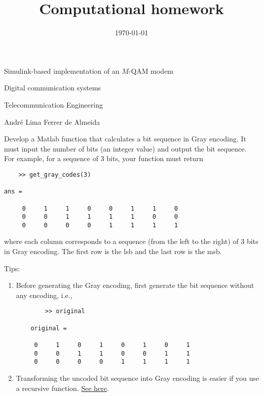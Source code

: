 \documentclass[12pt,a4paper]{article}
\begin{document}
\title{Computational homework}
\date{\today}
\maketitle

\begin{center}
    {\huge Simulink-based implementation of an \(M\)-QAM modem \par}
    {\LARGE Digital communication systems \par}
    {\Large Telecommunication Engineering \par}
    {\Large André Lima Ferrer de Almeida \par}
\end{center}

\problem \label{probone}
Develop a Matlab function that calculates a bit sequence in Gray encoding. It must input the number of bits (an integer value) and output the bit sequence. For example, for a sequence of \(3\) bits, your function must return

\begin{verbatim}
    >> get_gray_codes(3)

ans =

     0     1     1     0     0     1     1     0
     0     0     1     1     1     1     0     0
     0     0     0     0     1     1     1     1
\end{verbatim}
where each column corresponds to a sequence (from the left to the right) of 3 bits in Gray encoding. The first row is the \gls{lsb} and the last row is the \gls{msb}.

Tips:
\begin{enumerate}
    \item Before generating the Gray encoding, first generate the bit sequence without any encoding, i.e.,
    \begin{verbatim}
        >> original

    original =

     0     1     0     1     0     1     0     1
     0     0     1     1     0     0     1     1
     0     0     0     0     1     1     1     1
    \end{verbatim}
    \item Transforming the uncoded bit sequence into Gray encoding is easier if you use a recursive function. \href{https://en.wikipedia.org/wiki/Gray_code#Constructing_an_n-bit_Gray_code}{See here}.
\end{enumerate}
\end{document}
